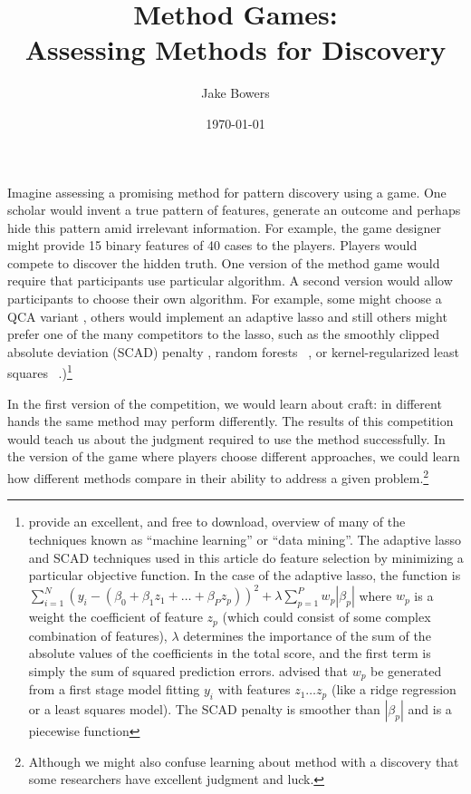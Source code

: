 \documentclass[12pt]{article}
\title{Method Games:\\ Assessing Methods for Discovery}
\author{Jake Bowers}
\date{\today}
\begin{document}
\maketitle

Imagine assessing a promising method for pattern discovery using a game.  One
scholar would invent a true pattern of features, generate an outcome and
perhaps hide this pattern amid irrelevant information.  For example, the game
designer might provide 15 binary features of 40 cases to the players. Players
would compete to discover the hidden truth.  One version of the method game
would require that participants use particular algorithm. A second version
would allow participants to choose their own algorithm. For example, some
might choose a QCA variant \citep{rihoux2008configurational}, others would
implement an adaptive lasso \citep{zou2006adaptive} and still others might
prefer one of the many competitors to the lasso, such as the smoothly clipped
absolute deviation (SCAD) penalty \citep{fan2001variable}, random forests
~\citep{breiman2001random}, or kernel-regularized least squares
~\citep{hainmueller2012kernel}.)\footnote{\citet{hasttibfried09} provide an
  excellent, and free to download, overview of many of the techniques known as
  ``machine learning'' or ``data mining''. The adaptive lasso and SCAD
  techniques used in this article do feature selection by minimizing a
  particular objective function. In the case of the adaptive lasso, the
  function is $\sum_{i=1}^N (y_i - ( \beta_0 + \beta_1 z_1 + \ldots + \beta_P
  z_p) )^2 + \lambda \sum_{p=1}^P w_p|\beta_p|$ where $w_p$ is a weight the
  coefficient of feature $z_p$ (which could consist of some complex
  combination of features), $\lambda$ determines the importance of the sum of
  the absolute values of the coefficients in the total score, and the first
  term is simply the sum of squared prediction errors. \citet{zou2006adaptive}
  advised that $w_p$ be generated from a first stage model fitting $y_i$ with
  features $z_1 \ldots z_p$ (like a ridge regression or a least squares
  model). The SCAD penalty is smoother than $|\beta_p|$ and is a piecewise
  function     }

In the first version of the
competition, we would learn about craft: in different hands the same method
may perform differently. The results of this competition would teach us about
the judgment required to use the method successfully.  In the version of the
game where players choose different approaches, we could learn how different
methods compare in their ability to address a given problem.\footnote{Although
  we might also confuse learning about method with a discovery that some
  researchers have excellent judgment and luck.}
\end{document}
